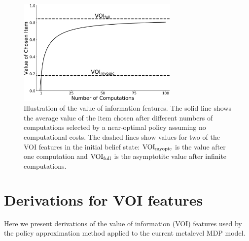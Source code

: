 \begin{figure}[b!]
  \centering
  \includegraphics[width=0.7\textwidth]{figs/attention/supp-voi-vpi.pdf}
  \caption{Illustration of the value of information features. The solid line shows the average value of the item chosen after different numbers of computations selected by a near-optimal policy assuming no computational costs. The dashed lines show values for two of the VOI features in the initial belief state: $\text{VOI}_\text{myopic}$ is the value after one computation and $\text{VOI}_\text{full}$ is the asymptotitc value after infinite computations.
  }
  \label{fig:attention-voi}
\end{figure}


\section{Derivations for VOI features}\label{app:attention-derivations}

Here we present derivations of the value of information (VOI) features used by the policy approximation method \citep{callaway2018learning} applied to the current metalevel MDP model.


